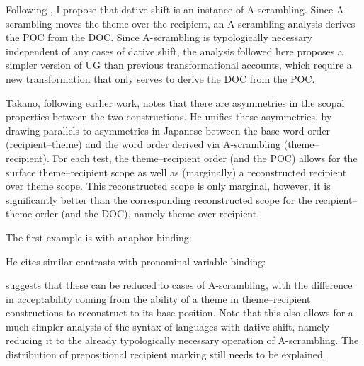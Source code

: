 Following \cite{Takano.1998}, I propose that dative shift is an instance of A-scrambling. Since A-scrambling moves the theme over the recipient, an A-scrambling analysis derives the POC from the DOC. Since A-scrambling is typologically necessary independent of any cases of dative shift, the analysis followed here proposes a simpler version of UG than previous transformational accounts, which require a new transformation that only serves to derive the DOC from the POC.

Takano, following earlier work, notes that there are asymmetries in the scopal properties between the two constructions. He unifies these asymmetries, by drawing parallels to asymmetries in Japanese between the base word order (recipient--theme) and the word order derived via A-scrambling (theme--recipient). For each test, the theme--recipient order (and the POC) allows for the surface theme--recipient scope as well as (marginally) a reconstructed recipient over theme scope. This reconstructed scope is only marginal, however, it is significantly better than the corresponding reconstructed scope for the recipient--theme order (and the DOC), namely theme over recipient.

The first example is with anaphor binding:
\begin{exe}
\ex 
\begin{xlist}
\end{xlist}
\end{exe} 
He cites similar contrasts with pronominal variable binding:
\begin{exe}
\ex
\begin{xlist}
\end{xlist}
\end{exe} 

\cite{Takano.1998} suggests that these can be reduced to cases of A-scrambling, with the difference in acceptability coming from the ability of a theme in theme--recipient constructions to reconstruct to its base position. Note that this also allows for a much simpler analysis of the syntax of languages with dative shift, namely reducing it to the already typologically necessary operation of A-scrambling. The distribution of prepositional recipient marking still needs to be explained.

